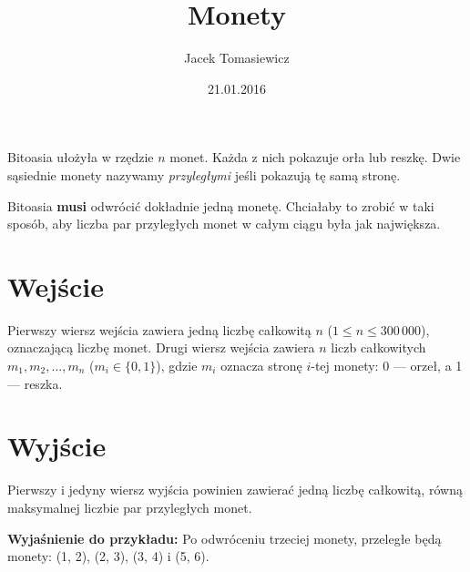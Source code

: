 \documentclass[zad,zawodnik,utf8]{sinol}
\title{Monety}
\author{Jacek Tomasiewicz} %
\date{21.01.2016}
\begin{document}
  \begin{tasktext}%
Bitoasia ułożyła w rzędzie $n$ monet. Każda z nich pokazuje orła lub reszkę.
Dwie sąsiednie monety nazywamy \textit{przyległymi} jeśli pokazują tę samą stronę.
 
Bitoasia \textbf{musi} odwrócić dokładnie jedną monetę.
Chciałaby to zrobić w taki sposób, aby liczba par przyległych monet w całym ciągu była jak największa. 

  \section{Wejście}
Pierwszy wiersz wejścia zawiera jedną liczbę całkowitą $n$ ($1 \leq n \leq 300\,000$), 
oznaczającą liczbę monet. Drugi wiersz wejścia zawiera $n$ liczb całkowitych 
$m_1, m_2, \ldots, m_n$ ($m_i \in \{0, 1\}$), gdzie $m_i$ oznacza stronę $i$-tej monety: 0 --- orzeł, a 1 --- reszka.

  \section{Wyjście}

Pierwszy i jedyny wiersz wyjścia powinien zawierać jedną liczbę całkowitą, 
równą maksymalnej liczbie par przyległych monet.

     \makecompactexample    
	 
\medskip
\noindent
\textbf{Wyjaśnienie do przykładu:} Po odwróceniu trzeciej monety, przeległe będą monety: (1, 2), (2, 3), (3, 4) i (5, 6).

  \end{tasktext}
\end{document}
